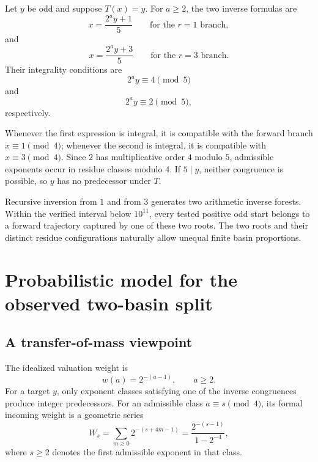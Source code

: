 \documentclass[11pt]{article}
\begin{document}
Let $y$ be odd and suppose $T(x)=y$. For $a\ge2$, the two inverse formulas are
\begin{equation}
x=\frac{2^a y+1}{5}
\qquad\text{for the }r=1\text{ branch},
\end{equation}
and
\begin{equation}
x=\frac{2^a y+3}{5}
\qquad\text{for the }r=3\text{ branch}.
\end{equation}
Their integrality conditions are
\begin{equation}
2^a y\equiv4\pmod5
\end{equation}
and
\begin{equation}
2^a y\equiv2\pmod5,
\end{equation}
respectively.

Whenever the first expression is integral, it is compatible with the forward branch $x\equiv1\pmod4$; whenever the second is integral, it is compatible with $x\equiv3\pmod4$. Since $2$ has multiplicative order $4$ modulo $5$, admissible exponents occur in residue classes modulo $4$. If $5\mid y$, neither congruence is possible, so $y$ has no predecessor under $T$.

Recursive inversion from $1$ and from $3$ generates two arithmetic inverse forests. Within the verified interval below $10^{11}$, every tested positive odd start belongs to a forward trajectory captured by one of these two roots. The two roots and their distinct residue configurations naturally allow unequal finite basin proportions.

\section{Probabilistic model for the observed two-basin split}

\subsection{A transfer-of-mass viewpoint}

The idealized valuation weight is
\[
w(a)=2^{-(a-1)},\qquad a\ge2.
\]
For a target $y$, only exponent classes satisfying one of the inverse congruences produce integer predecessors. For an admissible class $a\equiv s\pmod4$, its formal incoming weight is a geometric series
\begin{equation}
W_s=
\sum_{m\ge0}2^{-(s+4m-1)}
=
\frac{2^{-(s-1)}}{1-2^{-4}},
\end{equation}
where $s\ge2$ denotes the first admissible exponent in that class.
\end{document}
